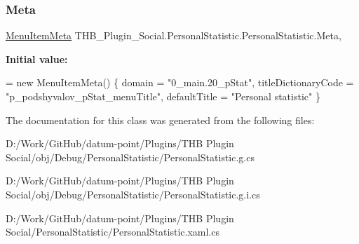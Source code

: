 \subsubsection{\texorpdfstring{Meta}{Meta}}
{\footnotesize\ttfamily \mbox{\hyperlink{class_uniform_client_1_1_plugins_1_1_menu_item_meta}{Menu\+Item\+Meta}} T\+H\+B\+\_\+\+Plugin\+\_\+\+Social.\+Personal\+Statistic.\+Personal\+Statistic.\+Meta\hspace{0.3cm}{\ttfamily [get]}, {\ttfamily [set]}}

{\bfseries Initial value\+:}
\begin{DoxyCode}
= \textcolor{keyword}{new} MenuItemMeta()
        \{
            domain = \textcolor{stringliteral}{"0\_main.20\_pStat"},
            titleDictionaryCode = \textcolor{stringliteral}{"p\_podshyvalov\_pStat\_menuTitle"},
            defaultTitle = \textcolor{stringliteral}{"Personal statistic"}
        \}
\end{DoxyCode}


The documentation for this class was generated from the following files\+:\begin{DoxyCompactItemize}
\item 
D\+:/\+Work/\+Git\+Hub/datum-\/point/\+Plugins/\+T\+H\+B Plugin Social/obj/\+Debug/\+Personal\+Statistic/Personal\+Statistic.\+g.\+cs\item 
D\+:/\+Work/\+Git\+Hub/datum-\/point/\+Plugins/\+T\+H\+B Plugin Social/obj/\+Debug/\+Personal\+Statistic/Personal\+Statistic.\+g.\+i.\+cs\item 
D\+:/\+Work/\+Git\+Hub/datum-\/point/\+Plugins/\+T\+H\+B Plugin Social/\+Personal\+Statistic/Personal\+Statistic.\+xaml.\+cs\end{DoxyCompactItemize}
